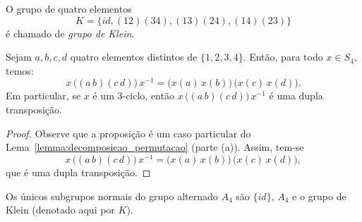 \documentclass[11pt,openany]{book}
\newenvironment{novo}{
    \color{red}
}{}
\begin{document}
\begin{definition}
\label{def:klein_group}
    O grupo de quatro elementos $$K = \{id, (12)(34), (13)(24), (14)(23)\}$$ é chamado de \textit{grupo de Klein}.
\end{definition}

\begin{novo}
\begin{proposition}
\label{prop:conjugacao_transpocicao}
    Sejam \(a,b,c,d\) quatro elementos distintos de \(\{1,2,3,4\}\). Então, para todo \(x\in S_4\), temos:
    \[
    x\,\bigl((a\,b)(c\,d)\bigr)\,x^{-1} = \bigl(x(a)\,x(b)\bigr)\,\bigl(x(c)\,x(d)\bigr).
    \]
    Em particular, se \(x\) é um \(3\)-ciclo, então \(x\,\bigl((a\,b)(c\,d)\bigr)\,x^{-1}\) é uma dupla transposição.
\end{proposition}
\begin{proof}
    Observe que a proposição é um caso particular do Lema~\ref{lemma:decomposicao_permutacao} (parte (a)). Assim, tem-se 
    \[x\,\bigl((a\,b)(c\,d)\bigr)\,x^{-1} = \bigl(x(a)\,x(b)\bigr)\,\bigl(x(c)\,x(d)\bigr),\]
    que é uma dupla transposição.
\end{proof}
\end{novo}

\begin{theorem}
\label{klein_subgrupos}
    Os únicos subgrupos normais do grupo alternado $A_4$ são $\{id\}$, $A_4$ e o grupo de Klein (denotado aqui por $K$). 
\end{theorem}
\end{document}
